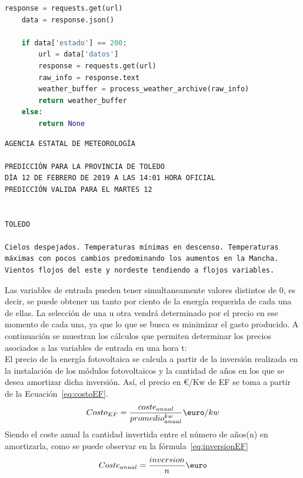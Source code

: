 \begin{itemize}
\begin{lstlisting}[language=Python,float=ht,caption={Función para obtener los valores meteorológicos de un día concreto},label={lst:aemet2}]
    response = requests.get(url)
    data = response.json()

    if data['estado'] == 200:
        url = data['datos']
        response = requests.get(url)
        raw_info = response.text
        weather_buffer = process_weather_archive(raw_info)
        return weather_buffer
    else:
        return None
\end{lstlisting}
\begin{lstlisting}[numbers=none,float=ht,caption={Ejemplo de respuesta de la API-AEMET para un día diferente al actual},label={lst:APIresponse2}]
AGENCIA ESTATAL DE METEOROLOGÍA

PREDICCIÓN PARA LA PROVINCIA DE TOLEDO
DÍA 12 DE FEBRERO DE 2019 A LAS 14:01 HORA OFICIAL
PREDICCIÓN VALIDA PARA EL MARTES 12


TOLEDO

Cielos despejados. Temperaturas mínimas en descenso. Temperaturas
máximas con pocos cambios predominando los aumentos en la Mancha.
Vientos flojos del este y nordeste tendiendo a flojos variables.
\end{lstlisting}
\end{itemize}

Las variables de entrada pueden tener simultaneamente valores distintos de 0, es decir, se puede obtener un tanto por ciento de la energía requerida de cada una de ellas. La selección de una u otra vendrá determinado por el precio en ese momento de cada una, ya que lo que se busca es minimizar el gasto producido. A continuación se muestran los cálculos que permiten determinar los precios asociados a las variables de entrada en una hora t: \\

	El precio de la energía fotovoltaica se calcula a partir de la inversión realizada en la instalación de los módulos fotovoltaicos y la cantidad de años en los que se desea amortizar dicha inversión. Así, el precio en €/Kw de EF se toma a partir de la Ecuación~\ref{eq:costoEF}.
	\begin{equation}
          \label{eq:costoEF}
	Costo_{EF} = \frac{coste_{anual}}{promedio^{kw}_{anual}} \textup{\euro}/kw
	\end{equation}
	Siendo el coste anual la cantidad invertida entre el número de años(n) en amortizarla, como se puede observar en la fórmula~\ref{eq:inversionEF}
	\begin{equation}
          \label{eq:inversionEF}
	Coste_{anual} = \frac{inversion}{n} \textup{\euro}
	\end{equation}


